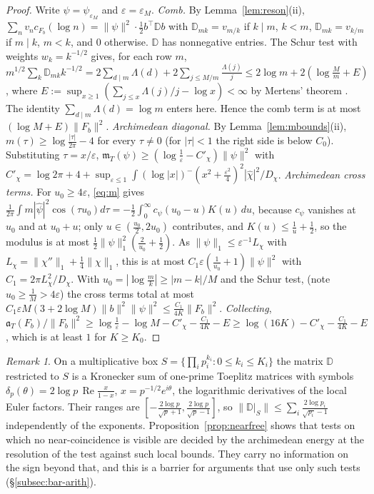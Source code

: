 \documentclass[11pt]{amsart}
\theoremstyle{definition}
\theoremstyle{remark}
\newtheorem{remark}[theorem]{Remark}
\newcommand{\Rel}{\operatorname{Re}}
\newcommand{\mT}{\mathfrak m_T}
\begin{document}
\begin{proof}
Write $\psi=\psi_{\varepsilon_M}$ and $\varepsilon=\varepsilon_M$. \emph{Comb.} By Lemma~\ref{lem:reson}(ii), $\sum_nv_nc_{F_b}(\log n)=\|\psi\|^2\cdot\frac12b^\top\mathbb Db$
with $\mathbb D_{mk}=v_{m/k}$ if $k\mid m$, $k<m$, $\mathbb D_{mk}=v_{k/m}$ if $m\mid k$, $m<k$, and $0$ otherwise. $\mathbb D$ has nonnegative entries.
The Schur test with weights $w_k=k^{-1/2}$ gives, for each row $m$,
$m^{1/2}\sum_k\mathbb D_{mk}k^{-1/2}=2\sum_{d\mid m}\Lambda(d)+2\sum_{j\le M/m}\frac{\Lambda(j)}j\le2\log m+2(\log\frac Mm+E)$, where
$E:=\sup_{x\ge1}(\sum_{j\le x}\Lambda(j)/j-\log x)<\infty$ by Mertens' theorem \cite[Thm.~2.7]{MontgomeryVaughan2007}. The identity
$\sum_{d\mid m}\Lambda(d)=\log m$ enters here. Hence the comb term is at most $(\log M+E)\|F_b\|^2$.
\emph{Archimedean diagonal.} By Lemma~\ref{lem:mbounds}(ii), $m(\tau)\ge\log\frac{|\tau|}{2\pi}-4$ for every $\tau\ne0$ (for $|\tau|<1$ the right side
is below $C_0$). Substituting $\tau=x/\varepsilon$, $\mT(\psi)\ge(\log\frac1\varepsilon-C'_\chi)\|\psi\|^2$ with
$C'_\chi=\log2\pi+4+\sup_{\varepsilon\le1}\int(\log|x|)^-(x^2+\frac{\varepsilon^2}4)^2|\widehat\chi|^2/D_\chi$.
\emph{Archimedean cross terms.} For $u_0\ge4\varepsilon$, \eqref{eq:m} gives
$\frac1{2\pi}\int m|\widehat\psi|^2\cos(\tau u_0)d\tau=-\frac12\int_0^\infty c_\psi(u_0-u)K(u)\,du$, because $c_\psi$ vanishes at $u_0$ and at
$u_0+u$; only $u\in(\frac{u_0}2,2u_0)$ contributes, and $K(u)\le\frac1u+\frac12$, so the modulus is at most
$\frac12\|\psi\|_1^2(\frac2{u_0}+\frac12)$. As $\|\psi\|_1\le\varepsilon^{-1}L_\chi$ with $L_\chi=\|\chi''\|_1+\frac14\|\chi\|_1$, this is at most
$C_1\varepsilon(\frac1{u_0}+1)\|\psi\|^2$ with $C_1=2\pi L_\chi^2/D_\chi$. With $u_0=|\log\frac mk|\ge|m-k|/M$ and the Schur test,
(note $u_0\ge\frac1M>4\varepsilon$) the cross terms total at most $C_1\varepsilon M(3+2\log M)\|b\|^2\|\psi\|^2\le\frac{C_1}{4K}\|F_b\|^2$.
\emph{Collecting}, $\mathfrak a_T(F_b)/\|F_b\|^2\ge\log\frac1{\varepsilon}-\log M-C'_\chi-\frac{C_1}{4K}-E\ge\log(16K)-C'_\chi-\frac{C_1}{4K}-E$, which is
at least $1$ for $K\ge K_0$.
\end{proof}

\begin{remark}\label{rem:boxes}
On a multiplicative box $S=\{\prod_ip_i^{k_i}:0\le k_i\le K_i\}$ the matrix $\mathbb D$ restricted to $S$ is a Kronecker sum of one-prime
Toeplitz matrices with symbols $\delta_p(\theta)=2\log p\,\Rel\frac x{1-x}$, $x=p^{-1/2}e^{i\theta}$, the logarithmic derivatives of the
local Euler factors. Their ranges are $[-\frac{2\log p}{\sqrt p+1},\frac{2\log p}{\sqrt p-1}]$, so $\|\mathbb D|_S\|\le\sum_i\frac{2\log p_i}{\sqrt{p_i}-1}$
independently of the exponents. Proposition~\ref{prop:nearfree} shows that tests on which no near-coincidence is visible are
decided by the archimedean energy at the resolution of the test against such local bounds. They carry no information on the
sign beyond that, and this is a barrier for arguments that use only such tests (\S\ref{subsec:bar-arith}).
\end{remark}
\end{document}

